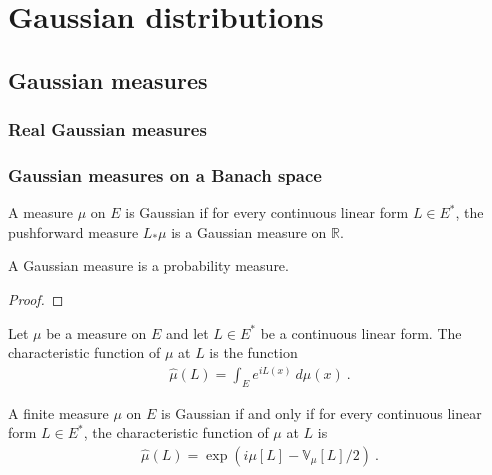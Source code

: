 \chapter{Gaussian distributions}
\label{chap:gaussian}

\section{Gaussian measures}
\label{sec:gaussian_measures}

\subsection{Real Gaussian measures}

\begin{definition}\label{def:gaussianReal}
  \mathlibok
\end{definition}

\subsection{Gaussian measures on a Banach space}

\begin{definition}\label{def:IsGaussian}
A measure $\mu$ on $E$ is Gaussian if for every continuous linear form $L \in E^*$, the pushforward measure $L_* \mu$ is a Gaussian measure on $\mathbb{R}$.
\end{definition}


\begin{lemma}\label{lem:IsGaussian.IsProbabilityMeasure}
A Gaussian measure is a probability measure.
\end{lemma}

\begin{proof}

\end{proof}


\begin{definition}\label{def:charFunCLM}
Let $\mu$ be a measure on $E$ and let $L \in E^*$ be a continuous linear form.
The characteristic function of $\mu$ at $L$ is the function
\begin{align*}
  \hat{\mu}(L) = \int_E e^{i L(x)} \: d\mu(x) \: .
\end{align*}
\end{definition}


\begin{theorem}\label{thm:isGaussian_iff_charFunCLM_eq}
A finite measure $\mu$ on $E$ is Gaussian if and only if for every continuous linear form $L \in E^*$, the characteristic function of $\mu$ at $L$ is
\begin{align*}
  \hat{\mu}(L) = \exp\left(i \mu[L] - \mathbb{V}_\mu[L] / 2\right) \: .
\end{align*}
\end{theorem}

